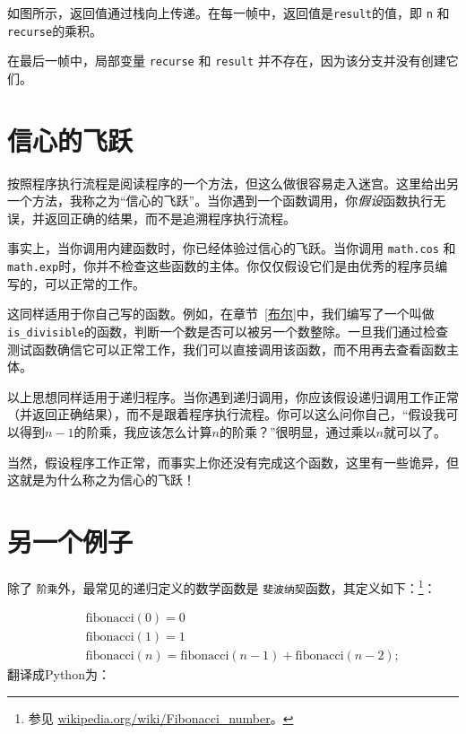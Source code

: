如图所示，返回值通过栈向上传递。在每一帧中，返回值是{\tt result}的值，即 {\tt n} 和 {\tt recurse}的乘积。


在最后一帧中，局部变量 {\tt recurse} 和 {\tt result} 并不存在，因为该分支并没有创建它们。


\section{信心的飞跃}

按照程序执行流程是阅读程序的一个方法，但这么做很容易走入迷宫。这里给出另一个方法，我称之为“信心的飞跃”。当你遇到一个函数调用，你{\em 假设}函数执行无误，并返回正确的结果，而不是追溯程序执行流程。

事实上，当你调用内建函数时，你已经体验过信心的飞跃。当你调用 {\tt math.cos} 和 {\tt math.exp}时，你并不检查这些函数的主体。你仅仅假设它们是由优秀的程序员编写的，可以正常的工作。

这同样适用于你自己写的函数。例如，在章节~\ref{布尔}中，我们编写了一个叫做\verb"is_divisible"的函数，判断一个数是否可以被另一个数整除。一旦我们通过检查测试函数确信它可以正常工作，我们可以直接调用该函数，而不用再去查看函数主体。


以上思想同样适用于递归程序。当你遇到递归调用，你应该假设递归调用工作正常（并返回正确结果），而不是跟着程序执行流程。你可以这么问你自己，“假设我可以得到$n-1$的阶乘，我应该怎么计算$n$的阶乘？”很明显，通过乘以$n$就可以了。

当然，假设程序工作正常，而事实上你还没有完成这个函数，这里有一些诡异，但这就是为什么称之为信心的飞跃！


\section{另一个例子}
\label{另一个例子}


除了 {\tt 阶乘}外，最常见的递归定义的数学函数是 {\tt 斐波纳契}函数，其定义如下：\footnote{参见 \url{wikipedia.org/wiki/Fibonacci_number}。}：

\vspace{-0.25in}
\begin{eqnarray*}
&& \mathrm{fibonacci}(0) = 0 \\
&& \mathrm{fibonacci}(1) = 1 \\
&& \mathrm{fibonacci}(n) = \mathrm{fibonacci}(n-1) + \mathrm{fibonacci}(n-2);
\end{eqnarray*}
%
翻译成Python为：

